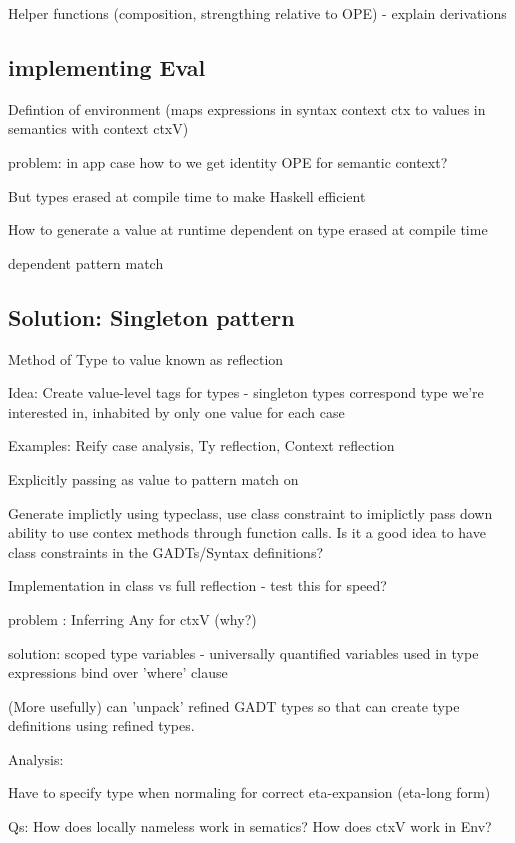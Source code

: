 \documentclass{article}
\begin{document}
Helper functions (composition, strengthing relative to OPE) - explain derivations

\subsection{implementing Eval}

Defintion of environment (maps expressions in syntax context ctx to values in semantics with context ctxV)

problem: in app case how to we get identity OPE for semantic context?

But types erased at compile time to make Haskell efficient

How to generate a value at runtime dependent on type erased at compile time

dependent pattern match \cite{SingletonsGuide}

\subsection{Solution: Singleton pattern}

Method of Type to value known as reflection \cite{SingletonsGuide}

Idea: Create value-level tags for types - singleton types correspond type we're interested in, inhabited by only one value for each case

Examples: Reify case analysis, Ty reflection, Context reflection

Explicitly passing as value to pattern match on

Generate implictly using typeclass, use class constraint to imiplictly pass down ability to use contex methods through function calls.
Is it a good idea to have class constraints in the GADTs/Syntax definitions?

Implementation in class vs full reflection - test this for speed?

problem : Inferring Any for ctxV (why?)

solution: scoped type variables - universally quantified variables used in type expressions bind over 'where' clause

(More usefully) can 'unpack' refined GADT types so that can create type definitions using refined types.

Analysis:

Have to specify type when normaling for correct eta-expansion (eta-long form)

Qs:
How does locally nameless work in sematics?
How does ctxV work in Env?

\cite{modalTypes}

\printbibliography
\end{document}
